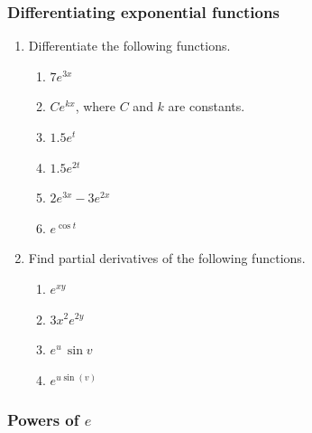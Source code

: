 \subsubsection{Differentiating exponential functions}
\label{subsubsec:differentiating-exponential-functions}



\begin{enumerate}
\item Differentiate the following functions.

  \begin{enumerate}
  \item $7e^{\displaystyle 3x}$


  \item $Ce^{\displaystyle kx}$, where $C$ and $k$ are constants.

  \item $1.5e^{\displaystyle t}$


  \item $1.5e^{\displaystyle 2t}$


  \item $2e^{\displaystyle 3x} - 3e^{\displaystyle 2x}$


  \item $e^{\displaystyle \cos t}$



\end{enumerate}
\item Find partial derivatives of the following functions.

  \begin{enumerate}
  \item $e^{\displaystyle xy}$


  \item $3x^{\displaystyle 2}e^{\displaystyle 2y}$


  \item $e^{\displaystyle u} \, \sin v$


  \item $e^{\displaystyle u \sin(v)}$


\end{enumerate}
\end{enumerate}
\subsubsection{Powers of $e$}
\label{subsubsec:powers-of-e}



